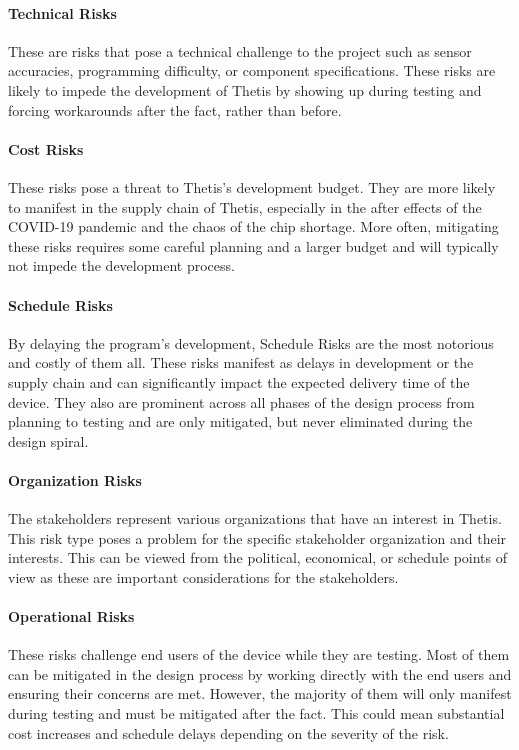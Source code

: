 \paragraph*{Technical Risks} These are risks that pose a technical challenge to the project such as sensor accuracies, programming difficulty, or component specifications. 
These risks are likely to impede the development of Thetis by showing up during testing and forcing workarounds after the fact, rather than before.

\paragraph*{Cost Risks} These risks pose a threat to Thetis's development budget.
They are more likely to manifest in the supply chain of Thetis, especially in the after effects of the COVID-19 pandemic and the chaos of the chip shortage.
More often, mitigating these risks requires some careful planning and a larger budget and will typically not impede the development process.

\paragraph*{Schedule Risks} By delaying the program's development, Schedule Risks are the most notorious and costly of them all.
These risks manifest as delays in development or the supply chain and can significantly impact the expected delivery time of the device.
They also are prominent across all phases of the design process from planning to testing and are only mitigated, but never eliminated during the design spiral.

\paragraph*{Organization Risks} The stakeholders represent various organizations that have an interest in Thetis.
This risk type poses a problem for the specific stakeholder organization and their interests.
This can be viewed from the political, economical, or schedule points of view as these are important considerations for the stakeholders.

\paragraph*{Operational Risks} These risks challenge end users of the device while they are testing.
Most of them can be mitigated in the design process by working directly with the end users and ensuring their concerns are met.
However, the majority of them will only manifest during testing and must be mitigated after the fact.
This could mean substantial cost increases and schedule delays depending on the severity of the risk.

